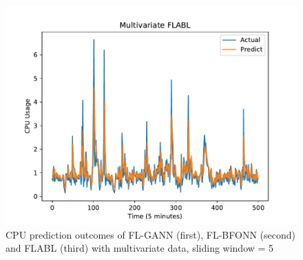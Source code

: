 \documentclass[runningheads]{llncs}
\begin{document}
\begin{figure}[h]
\begin{minipage}[t]{4cm}
		\includegraphics[width=1\textwidth =0cm 0cm 0cm 0cm]{images/pdf/multi_cpu_flabl.pdf}
	\end{minipage}
	\caption{CPU prediction outcomes of FL-GANN (first), FL-BFONN (second) and FLABL (third) with multivariate data, sliding window = 5} 
	\label{tn1_half_multi_CPU}
\end{figure}
\end{document}
